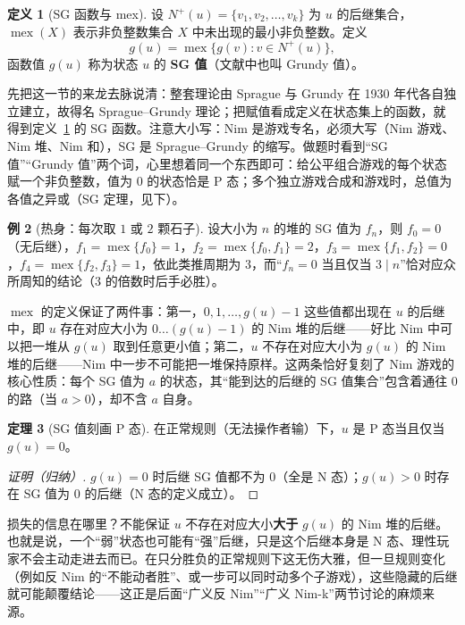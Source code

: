 \documentclass[UTF8,a4paper,11pt,oneside,openany,fontset=fandol]{ctexbook}
\theoremstyle{definition}
\newtheorem{definition}{定义}[chapter]
\newtheorem{theorem}[definition]{定理}
\newtheorem{example}[definition]{例}
\newcommand{\mex}{\operatorname{mex}}
\newcommand{\Np}{N^+}
\begin{document}
\begin{definition}[SG 函数与 mex]\label{def:sg}
设 $\Np(u)=\{v_1,v_2,\ldots,v_k\}$ 为 $u$ 的后继集合，$\mex(X)$ 表示非负整数集合 $X$ 中未出现的最小非负整数。定义
\[
 g(u)=\mex\{g(v):v\in\Np(u)\},
\]
函数值 $g(u)$ 称为状态 $u$ 的 \textbf{SG 值}（文献中也叫 Grundy 值）。
\end{definition}

先把这一节的来龙去脉说清：整套理论由 Sprague 与 Grundy 在 1930 年代各自独立建立，故得名 Sprague--Grundy 理论；把赋值看成定义在状态集上的函数，就得到定义~\ref{def:sg} 的 SG 函数。注意大小写：Nim 是游戏专名，必须大写（Nim 游戏、Nim 堆、Nim 和），SG 是 Sprague--Grundy 的缩写。做题时看到“SG 值”“Grundy 值”两个词，心里想着同一个东西即可：给公平组合游戏的每个状态赋一个非负整数，值为 $0$ 的状态恰是 P 态；多个独立游戏合成和游戏时，总值为各值之异或（SG 定理，见下）。

\begin{example}[热身：每次取 $1$ 或 $2$ 颗石子]
设大小为 $n$ 的堆的 SG 值为 $f_n$，则 $f_0=0$（无后继），$f_1=\mex\{f_0\}=1$，$f_2=\mex\{f_0,f_1\}=2$，$f_3=\mex\{f_1,f_2\}=0$，$f_4=\mex\{f_2,f_3\}=1$，依此类推周期为 $3$，而“$f_n=0$ 当且仅当 $3\mid n$”恰对应众所周知的结论（$3$ 的倍数时后手必胜）。
\end{example}

$\mex$ 的定义保证了两件事：第一，$0,1,\ldots,g(u)-1$ 这些值都出现在 $u$ 的后继中，即 $u$ 存在对应大小为 $0\ldots(g(u)-1)$ 的 Nim 堆的后继——好比 Nim 中可以把一堆从 $g(u)$ 取到任意更小值；第二，$u$ 不存在对应大小为 $g(u)$ 的 Nim 堆的后继——Nim 中一步不可能把一堆保持原样。这两条恰好复刻了 Nim 游戏的核心性质：每个 SG 值为 $a$ 的状态，其“能到达的后继的 SG 值集合”包含着通往 $0$ 的路（当 $a>0$），却不含 $a$ 自身。

\begin{theorem}[SG 值刻画 P 态]\label{thm:sgzero}
在正常规则（无法操作者输）下，$u$ 是 P 态当且仅当 $g(u)=0$。
\end{theorem}
\begin{proof}[证明（归纳）]
$g(u)=0$ 时后继 SG 值都不为 $0$（全是 N 态）；$g(u)>0$ 时存在 SG 值为 $0$ 的后继（N 态的定义成立）。
\end{proof}

损失的信息在哪里？不能保证 $u$ 不存在对应大小\textbf{大于} $g(u)$ 的 Nim 堆的后继。也就是说，一个“弱”状态也可能有“强”后继，只是这个后继本身是 N 态、理性玩家不会主动走进去而已。在只分胜负的正常规则下这无伤大雅，但一旦规则变化（例如反 Nim 的“不能动者胜”、或一步可以同时动多个子游戏），这些隐藏的后继就可能颠覆结论——这正是后面“广义反 Nim”“广义 Nim-k”两节讨论的麻烦来源。
\end{document}
